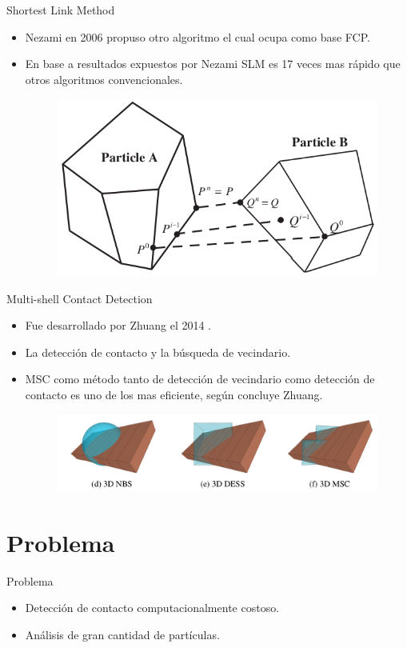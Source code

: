 \documentclass[11pt]{beamer}
\begin{document}
\begin{frame}{Shortest Link Method}
 \begin{itemize}
  \item Nezami en 2006 \cite{2006-Nezami} propuso otro algoritmo el cual ocupa como base FCP.
  \item En base a resultados expuestos por Nezami \cite{2006-Nezami} SLM es 17 veces mas rápido que otros algoritmos convencionales.
  \begin{figure}[\centering]
  \includegraphics[width=0.5\linewidth]{img/SLM}
  \end{figure}
 \end{itemize}
\end{frame}

\begin{frame}{Multi-shell Contact Detection}
 \begin{itemize}
  \item Fue desarrollado por Zhuang el 2014 \cite{2014-Zhuang}.
  \item La detección de contacto y la búsqueda de vecindario.
  \item MSC como método tanto de detección de vecindario como detección de contacto es uno de los mas eficiente, según concluye Zhuang.
  \begin{figure}[\centering]
   \includegraphics[width=0.8\linewidth]{img/Multi-shell}
  \end{figure}
 \end{itemize}
\end{frame}

\section{Problema}
\begin{frame}{Problema}
    \begin{itemize}
        \item Detección de contacto computacionalmente costoso.
        \item Análisis de gran cantidad de partículas.
    \end{itemize}
\end{frame}
\end{document}
